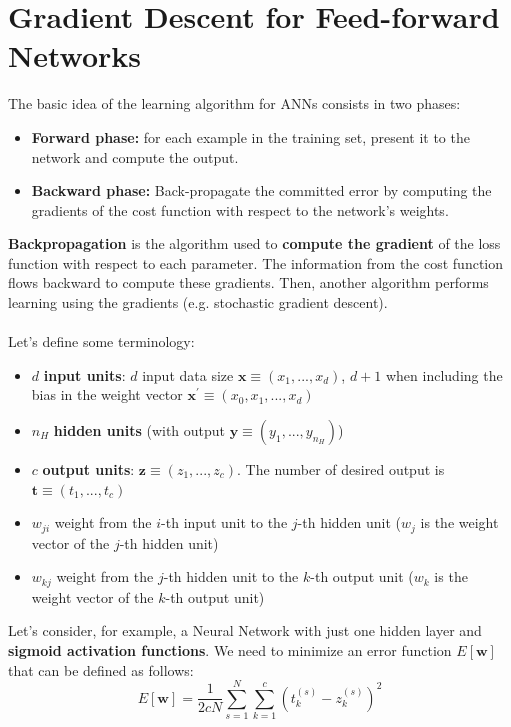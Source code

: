 \section{Gradient Descent for Feed-forward Networks}
The basic idea of the learning algorithm for ANNs consists in two phases:
\begin{itemize}
    \item \textbf{Forward phase:} for each example in the training set, present it to the network and compute the output.
    \item \textbf{Backward phase:} Back-propagate the committed error by computing the gradients of the cost function with respect to the network's weights. 
\end{itemize}
\textbf{Backpropagation} is the algorithm used to \textbf{compute the gradient} of the loss function with respect to each parameter. The information from the cost function flows backward to compute these gradients. Then, another algorithm performs learning using the gradients (e.g. stochastic gradient descent).\\\\
Let's define some terminology:
\begin{itemize}
    \item $d$ \textbf{input units}: $d$ input data size $\textbf{x} \equiv (x_{1},...,x_{d})$, $d + 1$ when including the bias in the weight vector $\textbf{x}^{'} \equiv (x_{0}, x_{1},...,x_{d})$

    \item $n_{H}$ \textbf{hidden units} (with output $\textbf{y} \equiv (y_{1},...,y_{n_{H}})$)

    \item $c$ \textbf{output units}: $\textbf{z} \equiv (z_{1},...,z_{c})$. The number of desired output is $\textbf{t} \equiv (t_{1},...,t_{c})$

    \item $w_{ji}$ weight from the $i$-th input unit to the $j$-th hidden unit ($w_{j}$ is the weight vector of the $j$-th hidden unit)

    \item $w_{kj}$ weight from the $j$-th hidden unit to the $k$-th output unit ($w_{k}$ is the weight vector of the $k$-th output unit)
\end{itemize}
Let's consider, for example, a Neural Network with just one hidden layer and \textbf{sigmoid activation functions}. We need to minimize an error function $E[\textbf{w}]$ that can be defined as follows:
\[E[\textbf{w}] = \frac{1}{2cN}\sum_{s=1}^{N}\sum_{k=1}^{c}(t_{k}^{(s)} - z_{k}^{(s)})^{2}\]
